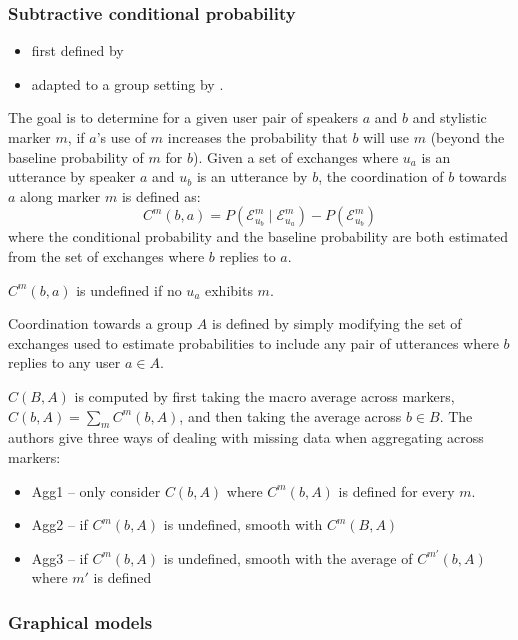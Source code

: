 \documentclass[12pt]{scrartcl}
\begin{document}
\subsubsection{Subtractive conditional probability}

\begin{itemize}
  \item first defined by \cite{danescu-niculescu-mizil_mark_2011}
  \item adapted to a group setting by \cite{danescu-niculescu-mizil_echoes_2012}.
\end{itemize}

The goal is to determine for a given user pair of speakers $a$ and $b$ and stylistic marker $m$, if $a$'s use of $m$ increases the probability that $b$ will use $m$ (beyond the baseline probability of $m$ for $b$).
Given a set of exchanges where $u_a$ is an utterance by speaker $a$ and $u_b$ is an utterance by $b$, the coordination of $b$ towards $a$ along marker $m$ is defined as:
\[
  C^m(b,a) = P(\mathcal{E}^{m}_{u_b} \mid \mathcal{E}^m_{u_a}) - P(\mathcal{E}^m_{u_b})
\]
where the conditional probability and the baseline probability are both estimated from the set of exchanges where $b$ replies to $a$.

$C^m(b,a)$ is undefined if no $u_a$ exhibits $m$.

Coordination towards a group $A$ is defined by simply modifying the set of exchanges used to estimate probabilities to include any pair of utterances where $b$ replies to any user $a\in A$.

$C(B,A)$ is computed by first taking the macro average across markers, $C(b,A) = \sum_m C^m(b,A)$, and then taking the average across $b\in B$.
The authors give three ways of dealing with missing data when aggregating across markers:
\begin{itemize}
  \item Agg1 -- only consider $C(b,A)$ where $C^m(b,A)$ is defined for every $m$.
  \item Agg2 -- if $C^m(b,A)$ is undefined, smooth with $C^m(B,A)$
  \item Agg3 -- if $C^m(b,A)$ is undefined, smooth with the average of $C^{m'}(b,A)$ where $m'$ is defined
\end{itemize}

\subsubsection{Graphical models}
\end{document}
